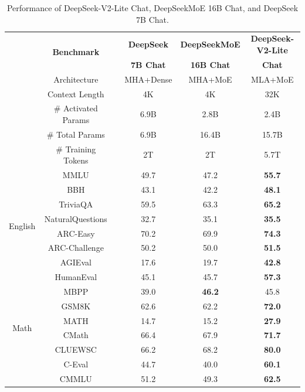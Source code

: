 \documentclass[11pt, a4paper, logo, copyright, nonumbering]{deepseek}
\newcommand{\dsviilite}{DeepSeek-V2-Lite}
\begin{document}
\begin{CJK*}{UTF8}{gbsn}
\begin{table}[!ht]
    \centering
    \setlength{\tabcolsep}{4pt}
    \begin{tabular}{@{}c c l c c c@{}}
    \toprule
    & \multirow{2}{*}{\centering \textbf{Benchmark}} & & \textbf{DeepSeek} & \textbf{DeepSeekMoE} & \textbf{DeepSeek-V2-Lite} \\
    & & & \textbf{7B Chat} & \textbf{16B Chat} & \textbf{Chat} \\
    \midrule
    & Architecture &  & MHA+Dense & MHA+MoE & MLA+MoE \\
    & Context Length & & 4K & 4K & 32K \\
    & \# Activated Params &  & 6.9B & 2.8B & 2.4B \\
    & \# Total Params &  & 6.9B & 16.4B & 15.7B \\
    & \# Training Tokens  &  & 2T & 2T & 5.7T \\
    \midrule
    \multirow{8}{*}{English} 
    & MMLU & & 49.7 &  47.2 & \textbf{55.7} \\
    & BBH & & 43.1 & 42.2 & \textbf{48.1} \\
    & TriviaQA & & 59.5 & 63.3 & \textbf{65.2} \\
    & NaturalQuestions & & 32.7 & 35.1 & \textbf{35.5} \\
    & ARC-Easy & & 70.2 &  69.9 & \textbf{74.3} \\
    & ARC-Challenge & & 50.2 &  50.0 & \textbf{51.5} \\
    & AGIEval & & 17.6 & 19.7 & \textbf{42.8} \\
    \midrule
    \multirow{3}{*}{Code} & HumanEval & & 45.1 & 45.7 & \textbf{57.3} \\
    & MBPP & & 39.0 & \textbf{46.2} & 45.8 \\
    \midrule
    \multirow{4}{*}{Math} & GSM8K & & 62.6 &  62.2 & \textbf{72.0} \\
    & MATH & & 14.7 & 15.2 & \textbf{27.9} \\
    & CMath & & 66.4 & 67.9 & \textbf{71.7} \\
    \midrule
    \multirow{3}{*}{Chinese} & CLUEWSC & & 66.2  & 68.2 & \textbf{80.0} \\
    & C-Eval & & 44.7 &  40.0 & \textbf{60.1} \\
    & CMMLU & & 51.2  &  49.3 & \textbf{62.5} \\
    \bottomrule
    \end{tabular}
    \caption{
    Performance of \dsviilite{} Chat, DeepSeekMoE 16B Chat, and DeepSeek 7B Chat. 
    }
    \label{tab:dsviilite_chat}
\end{table}


\end{CJK*}
\end{document}
